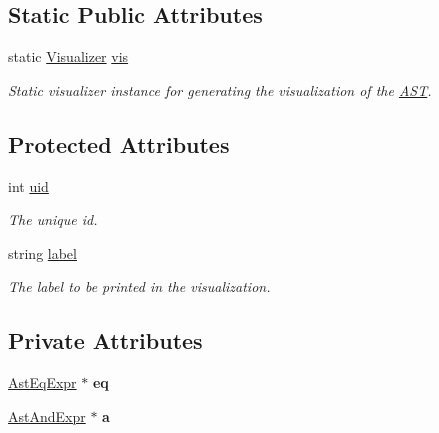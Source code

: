 \subsection*{Static Public Attributes}
\begin{DoxyCompactItemize}
\item 
\hypertarget{classAST_aca9e6637209b31e03a09c0d42f29bdfa}{static \hyperlink{classVisualizer}{Visualizer} \hyperlink{classAST_aca9e6637209b31e03a09c0d42f29bdfa}{vis}}\label{classAST_aca9e6637209b31e03a09c0d42f29bdfa}

\begin{DoxyCompactList}\small\item\em Static visualizer instance for generating the visualization of the \hyperlink{classAST}{A\-S\-T}. \end{DoxyCompactList}\end{DoxyCompactItemize}
\subsection*{Protected Attributes}
\begin{DoxyCompactItemize}
\item 
\hypertarget{classAST_a847b778f1c3dd5a19de32de432ee6e15}{int \hyperlink{classAST_a847b778f1c3dd5a19de32de432ee6e15}{uid}}\label{classAST_a847b778f1c3dd5a19de32de432ee6e15}

\begin{DoxyCompactList}\small\item\em The unique id. \end{DoxyCompactList}\item 
\hypertarget{classAST_ab2e239ccc0688d2341724432ff5a1a31}{string \hyperlink{classAST_ab2e239ccc0688d2341724432ff5a1a31}{label}}\label{classAST_ab2e239ccc0688d2341724432ff5a1a31}

\begin{DoxyCompactList}\small\item\em The label to be printed in the visualization. \end{DoxyCompactList}\end{DoxyCompactItemize}
\subsection*{Private Attributes}
\begin{DoxyCompactItemize}
\item 
\hypertarget{classAstAndExpr_aec33f836a7d0f47cf78bc11043935313}{\hyperlink{classAstEqExpr}{Ast\-Eq\-Expr} $\ast$ {\bfseries eq}}\label{classAstAndExpr_aec33f836a7d0f47cf78bc11043935313}

\item 
\hypertarget{classAstAndExpr_ab9f16e8ea62625a5d66792a08b6a3ae2}{\hyperlink{classAstAndExpr}{Ast\-And\-Expr} $\ast$ {\bfseries a}}\label{classAstAndExpr_ab9f16e8ea62625a5d66792a08b6a3ae2}

\end{DoxyCompactItemize}


